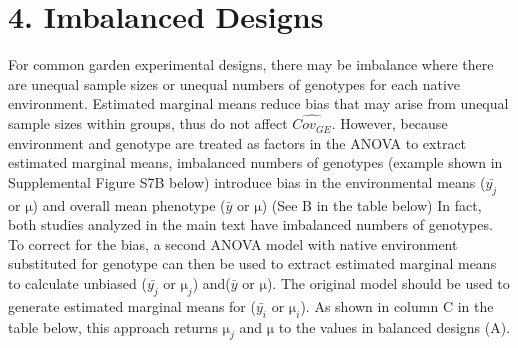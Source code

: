 \documentclass[11pt, oneside]{amsart}
\begin{document}
\clearpage
\newpage


\section{4. Imbalanced Designs}

For common garden experimental designs, there may be imbalance where there are unequal sample sizes or unequal numbers of genotypes for each native environment. Estimated marginal means reduce bias that may arise from unequal sample sizes within groups, thus do not affect $\hat{Cov_{GE}}$. However, because environment and genotype are treated as factors in the ANOVA to extract estimated marginal means, imbalanced numbers of genotypes (example shown in Supplemental Figure S7B below) introduce bias in the environmental means ($\bar{y_j}$ or $\si\micro$) and overall mean phenotype ($\bar{y}$ or $\si\micro$) (See B in the table below)  In fact, both studies analyzed in the main text have imbalanced numbers of genotypes. To correct for the bias, a second ANOVA model with native environment substituted for genotype can then be used to extract estimated marginal means to calculate unbiased ($\bar{y_{j}}$ or $\si\micro_{j}$) and($\bar{y}$ or $\si\micro$). The original model should be used to generate estimated marginal means for  ($\bar{y_{i}}$ or $\si\micro_{i}$). As shown in column C in the table below, this approach returns $\si\micro_{j}$ and $\si\micro$ to the values in balanced designs (A). 
\end{document}
